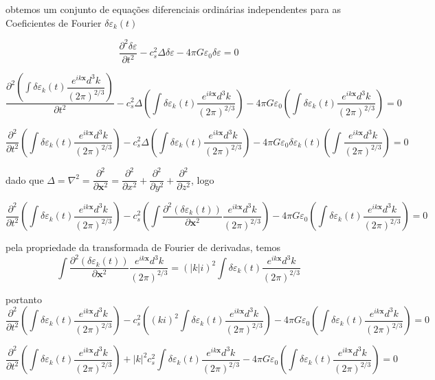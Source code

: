 \documentclass[a4paper,12pt]{article}
\begin{document}
obtemos um conjunto de equações diferenciais ordinárias independentes para as
Coeficientes de Fourier $\delta\varepsilon_k (t)$

$$\dfrac{\partial^2\delta\varepsilon}{\partial t^2} - c^2_s\Delta\delta\varepsilon - 4\pi G\varepsilon_0\delta\varepsilon = 0$$

$$\dfrac{\partial^2 \left(\int \delta\varepsilon_k (t)  \dfrac{e^{ik\textbf{x}}d^3 k}{(2\pi)^{2/3}} \right)}{\partial t^2} - c^2_s\Delta\left(\int \delta\varepsilon_k (t)  \dfrac{e^{ik\textbf{x}}d^3 k}{(2\pi)^{2/3}} \right) - 4\pi G\varepsilon_0\left(\int \delta\varepsilon_k (t)  \dfrac{e^{ik\textbf{x}}d^3 k}{(2\pi)^{2/3}} \right) = 0$$

$$ \dfrac{\partial^2 }{\partial t^2}\left(\int \delta\varepsilon_k (t)  \dfrac{e^{ik\textbf{x}}d^3 k}{(2\pi)^{2/3}} \right) - c^2_s\Delta\left(\int \delta\varepsilon_k (t) \dfrac{e^{ik\textbf{x}} d^3 k}{(2\pi)^{2/3}} \right) - 4\pi G\varepsilon_0\delta\varepsilon_k (t)\left(\int   \dfrac{e^{ik\textbf{x}}d^3 k}{(2\pi)^{2/3}} \right) = 0$$

dado que $\Delta = \nabla^2 = \dfrac{\partial^2}{\partial\textbf{x}^2} = \dfrac{\partial^2}{\partial x^2} + \dfrac{\partial^2}{\partial y^2} + \dfrac{\partial^2}{\partial z^2}$, logo

$$\dfrac{\partial^2 }{\partial t^2}\left(\int \delta\varepsilon_k (t)  \dfrac{e^{ik\textbf{x}}d^3 k}{(2\pi)^{2/3}} \right)  - c^2_s\left(\int  \dfrac{\partial^2  (\delta\varepsilon_k (t))}{\partial\textbf{x}^2} \dfrac{e^{ik\textbf{x}}d^3 k}{(2\pi)^{2/3}} \right) - 4\pi G\varepsilon_0  \left(\int \delta\varepsilon_k (t)  \dfrac{e^{ik\textbf{x}}d^3 k}{(2\pi)^{2/3}} \right) = 0$$

pela propriedade da transformada de Fourier de derivadas, temos 
$$\int  \dfrac{\partial^2  (\delta\varepsilon_k (t))}{\partial\textbf{x}^2} \dfrac{e^{ik\textbf{x}}d^3 k}{(2\pi)^{2/3}} = (|k|i)^2\int  \delta\varepsilon_k (t) \dfrac{e^{ik\textbf{x}}d^3 k}{(2\pi)^{2/3}}$$

portanto
$$\dfrac{\partial^2 }{\partial t^2}\left(\int \delta\varepsilon_k (t)  \dfrac{e^{ik\textbf{x}}d^3 k}{(2\pi)^{2/3}} \right)  - c^2_s \left((ki)^2\int  \delta\varepsilon_k (t) \dfrac{e^{ik\textbf{x}}d^3 k}{(2\pi)^{2/3}}\right) - 4\pi G\varepsilon_0  \left(\int \delta\varepsilon_k (t)  \dfrac{e^{ik\textbf{x}}d^3 k}{(2\pi)^{2/3}} \right) = 0$$

$$\dfrac{\partial^2 }{\partial t^2}\left(\int \delta\varepsilon_k (t)  \dfrac{e^{ik\textbf{x}}d^3 k}{(2\pi)^{2/3}} \right)  + |k|^2c^2_s\int  \delta\varepsilon_k (t) \dfrac{e^{ik\textbf{x}}d^3 k}{(2\pi)^{2/3}} - 4\pi G\varepsilon_0  \left(\int \delta\varepsilon_k (t)  \dfrac{e^{ik\textbf{x}}d^3 k}{(2\pi)^{2/3}} \right) = 0$$
\end{document}
